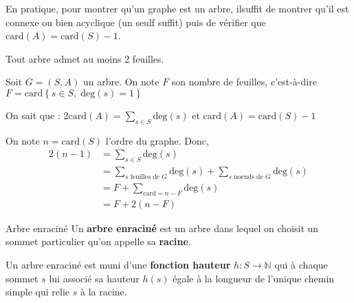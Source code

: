 \begin{note}
En pratique, pour montrer qu'un graphe est un arbre, ilsuffit de montrer qu'il est connexe ou bien acyclique (un seulf suffit) puis de vérifier que $\mathrm{card} (A) = \mathrm{card} (S) - 1$.
\end{note}

\begin{Corollary}{}{}
Tout arbre admet au moins 2 feuilles.
\end{Corollary}

\begin{myproof}
  Soit $G = (S,A)$ un arbre. On note $F$ son nombre de feuilles, c'est-à-dire $F = \mathrm{card} \left\{ s \in S,\; \mathrm{deg}(s) = 1  \right\}$  

  On sait que : $2 \mathrm{card} (A) = \sum _{s \in S} \mathrm{deg} (s)$ et $\mathrm{card} (A) = \mathrm{card} (S) -1$

  On note $n = \mathrm{card} (S)$ l'ordre du graphe. Donc, 
  \begin{align*}
    2(n-1) &= \sum _{s \in S} \mathrm{deg} (s) \\ 
           &= \sum _{s \text{ feuilles de }G} \mathrm{deg} (s) +  \sum _{s \text{ noeuds de }G} \mathrm{deg} (s) \\ 
           &= F + \sum _{\mathrm{card} = n-F}  \mathrm{deg} (s) \\ 
           &= F + 2(n-F)
  \end{align*}
\end{myproof}

\begin{Definition}[colbacktitle=red!75!black]{Arbre enraciné}{}
Un \textbf{arbre enraciné} est un arbre dans lequel on choisit un sommet particulier qu'on appelle sa \textbf{racine}.

Un arbre enraciné est muni d'une \textbf{fonction hauteur} $h : S \to \mathbb{N}$ qui à chaque sommet $s$ lui associé sa hauteur $h(s)$ égale à la longueur de l'unique chemin simple qui relie $s$ à la racine.
\end{Definition}

